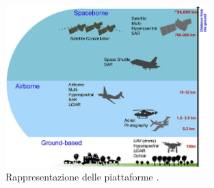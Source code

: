 \begin{figure}[H]
    \centering
    \includegraphics[width=0.7\textwidth]{Immagini/Generiche/Common-Remote-Sensing-Platform-a.png}
    \caption{Rappresentazione delle piattaforme \cite{Rappresentazione_piattaforme}.}
    \label{fig:Classificazione_Piattaforme}
\end{figure}


